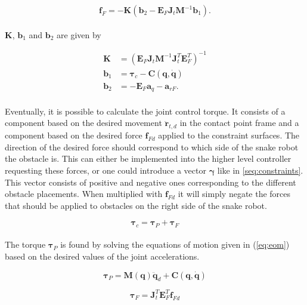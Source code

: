 \begin{equation}
    \mathbf{f}_F = -\mathbf{K} (\mathbf{b}_2 - \mathbf{E}_F \mathbf{J}_t \mathbf{M}^{-1} \mathbf{b}_1).
\end{equation}
\\
$\mathbf{K}$, $\mathbf{b}_1$ and $\mathbf{b}_2$ are given by

\begin{equation}
    \begin{split}
        \mathbf{K} &= (\mathbf{E}_F \mathbf{J}_t \mathbf{M}^{-1} \mathbf{J}_t^T \mathbf{E}^T_F)^{-1}\\
        \mathbf{b}_1 &= \boldsymbol{\tau}_c - \mathbf{C(q, \dot{q})}\\
        \mathbf{b}_2 &= - \mathbf{E}_F \mathbf{a}_q - \mathbf{a}_{rF}.
    \end{split}
\end{equation}
\\
Eventually, it is possible to calculate the joint control torque. It consists of a component based on the desired movement $\mathbf{\ddot{r}}_{t,d}$ in the contact point frame and a component based on the desired force $\mathbf{f}_{Fd}$ applied to the constraint surfaces. The direction of the desired force should correspond to which side of the snake robot the obstacle is. This can either be implemented into the higher level controller requesting these forces, or one could introduce a vector $\boldsymbol{\gamma}$ like in \ref{seq:constraints}. This vector consists of positive and negative ones corresponding to the different obstacle placements. When multiplied with $\mathbf{f}_{Fd}$ it will simply negate the forces that should be applied to obstacles on the right side of the snake robot.

\begin{equation}\label{eq:dhpfc_tau_c}
    \boldsymbol{\tau}_c = \boldsymbol{\tau}_P + \boldsymbol{\tau}_F
\end{equation}
\\
The torque $\boldsymbol{\tau}_P$ is found by solving the equations of motion given in (\ref{eq:eom}) based on the desired values of the joint accelerations.

\begin{equation}\label{eq:dhpfc_taup}
    \boldsymbol{\tau}_P = \mathbf{M(q)} \ddot{\mathbf{q}}_d + \mathbf{C}(\mathbf{q,\dot{q}})
\end{equation}

\begin{equation}\label{eq:dhpfc_tauf}
    \boldsymbol{\tau}_F = \mathbf{J}_t^T \mathbf{E}^T_F \mathbf{f}_{Fd}
\end{equation}

